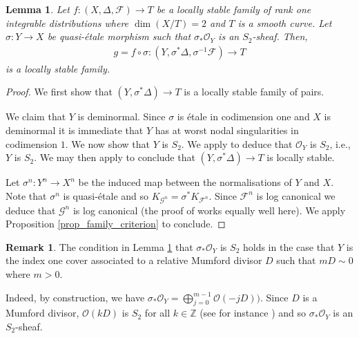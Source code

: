 \documentclass[12pt, a4paper]{amsart}
\newtheorem{lemma}[theorem]{Lemma}
\theoremstyle{definition}
\newtheorem{remark}[theorem]{Remark}
\theoremstyle{named}
\begin{document}
\begin{lemma}
\label{lem_cover_s2}
    Let $f\colon (X, \Delta, \mathcal F) \rightarrow T$ be a locally stable family of rank one integrable distributions where 
    $\dim (X/T) = 2$ and $T$ is a smooth curve.
    Let $\sigma\colon Y \rightarrow X$ be quasi-\'etale morphism such that $\sigma_*\mathcal O_Y$ is an $S_2$-sheaf. 
    Then, \begin{align*}g= f \circ \sigma \colon (Y, \sigma^*\Delta, \sigma^{-1}\mathcal F) \rightarrow T\end{align*} is a locally stable family.
\end{lemma}
\begin{proof}
We first show that $(Y, \sigma^*\Delta) \rightarrow T$
is a locally stable family of pairs.

    We claim that $Y$ is deminormal.
    Since $\sigma$ is \'etale in codimension one and $X$ is deminormal it is immediate that $Y$ has at worst nodal singularities in codimension $1$.
    We now show that $Y$ is $S_2$.  We apply \cite[Proposition 5.4]{KM98}
    to deduce that $\mathcal O_Y$ is $S_2$, i.e., $Y$ is $S_2$.
    We may then apply \cite[Lemma 2.9]{modbook} to conclude
    that $(Y, \sigma^*\Delta) \rightarrow T$ is locally stable.

    

  

\medskip


Let $\sigma^n\colon Y^n \rightarrow X^n$ be the induced map between the normalisations of $Y$ and $X$.  Note that $\sigma^n$
is quasi-\'etale and so $K_{\mathcal G^n} = \sigma^*K_{\mathcal F^n}$.  Since $\mathcal F^n$
is log canonical we deduce that $\mathcal G^n$
is log canonical (the proof of \cite[Proposition 5.20]{KM98} works equally well here).  We apply 
Proposition \ref{prop_family_criterion} to conclude.
\end{proof}

\begin{remark}
    The condition in Lemma \ref{lem_cover_s2} that 
    $\sigma_*\mathcal O_Y$ is $S_2$ holds in the case that 
    $Y$ is the index one cover associated to a relative Mumford divisor $D$ such that $mD \sim 0$ where $m>0$.

    Indeed, by construction, we have $\sigma_*\mathcal O_Y = \bigoplus_{j = 0}^{m-1}\mathcal O(-jD))$. Since $D$ is a Mumford divisor,  $\mathcal O(kD)$ is $S_2$ for all $k \in \mathbb Z$ (see for instance \cite[p. 136]{modbook})
    and so $\sigma_*\mathcal O_Y$ is an $S_2$-sheaf.
\end{remark}
\end{document}
